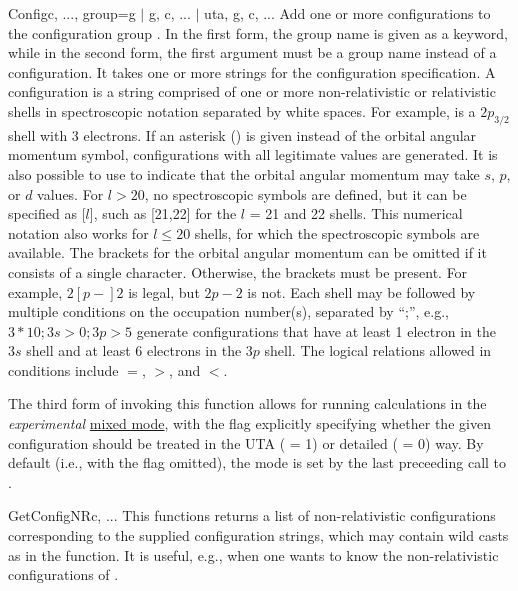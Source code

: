 \begin{fundesc}{Config}{c, ..., group=g $\mid$ g, c, ... $\mid$ uta, g, c, ...}
Add one or more configurations to the configuration group . In the first
form, the group name  is given as a keyword, while in the second form,
the first argument must be a group name instead of a configuration. It takes one
or more strings for the configuration specification. A configuration  is
a string comprised of one or more non-relativistic or relativistic shells in
spectroscopic notation separated by white spaces. For example,  is a
$2p_{3/2}$ shell with 3 electrons. If an asterisk (\key{*}) is given instead of
the orbital angular momentum symbol, configurations with all legitimate values
are generated. It is also possible to use \key{[s,p,d]} to indicate that the
orbital angular momentum may take $s$, $p$, or $d$ values. For $l > 20$, no
spectroscopic symbols are defined, but it can be specified as [$l$], such as
[21,22] for the $l$ = 21 and 22 shells. This numerical notation also works for
$l \le 20$ shells, for which the spectroscopic symbols  are available. The brackets for the
orbital angular momentum can be omitted if it consists of a single character.
Otherwise, the brackets must be present. For example, $2[p-]2$  is legal, but
$2p-2$ is not. Each shell may be followed by multiple conditions on the
occupation number(s), separated by ``;'', e.g., $3*10;3s>0;3p>5$ generate
configurations that have at least 1 electron in the $3s$ shell and at least 6
electrons in the $3p$ shell. The logical relations allowed in conditions
include $=$, $>$, and $<$.

The third form of invoking this function allows for running calculations in the
{\em experimental} \hyperref[subsec:mixed_mode]{mixed mode}, with the 
flag explicitly specifying whether the given configuration should be treated in
the UTA ( = 1) or detailed ( = 0) way. By default (i.e., with
the  flag omitted), the mode is set by the last preceeding call to
.
\end{fundesc}

\begin{fundesc}{GetConfigNR}{c, ...}
This functions returns a list of non-relativistic configurations corresponding
to the supplied configuration strings, which may contain wild casts as in the
 function. It is useful, e.g., when one wants to know the
non-relativistic configurations of .
\end{fundesc}


